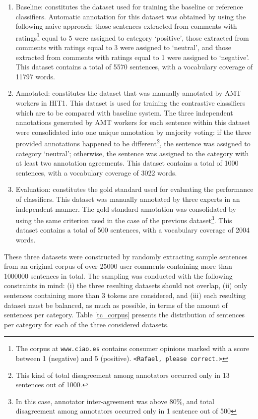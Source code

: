 \documentclass[11pt,letterpaper]{article}
\begin{document}
\begin{enumerate}
\item Baseline: constitutes the dataset used for training the baseline or reference classifiers. 
Automatic annotation for this dataset was obtained by using the following naive approach: those sentences extracted from
comments with ratings\footnote{The corpus at \texttt{www.ciao.es} contains consumer opinions marked with a score between 1 (negative) and 5 (positive). \texttt{<Rafael, please correct.>}} equal to 5 were assigned to category `positive', those extracted from comments with ratings 
equal to 3 were assigned to `neutral', and those extracted from comments with ratings equal to 1 were assigned to
`negative'. This dataset contains a total of 5570 sentences, with a vocabulary coverage of 11797 words. 

\item Annotated: constitutes the dataset that was manually annotated by AMT workers in HIT1.
This dataset is used for training the contrastive classifiers which are to be compared with baseline system.
The three independent annotations generated by AMT workers for each sentence within this dataset were consolidated into one unique annotation
by majority voting: if the three provided annotations happened to be
different\footnote{This kind of total disagreement among annotators occurred only in 13 sentences out of 1000.}, 
the sentence was assigned to category `neutral'; otherwise, the sentence was assigned to the category with
at least two annotation agreements. This dataset contains a total of 1000 sentences, with a vocabulary coverage 
of 3022 words. 

\item Evaluation: constitutes the gold standard used for evaluating the performance of classifiers.
This dataset was manually annotated by three experts in an independent manner. The gold standard annotation
was consolidated by using the same criterion used in the case of the previous dataset\footnote{In this case, 
annotator inter-agreement was above 80\%, and total disagreement among annotators occurred only in 1 sentence
out of 500}. This dataset contains a total of 500 sentences, with a vocabulary coverage of 2004 words.    
\end{enumerate} 

These three datasets were constructed by randomly extracting sample sentences from an original corpus
of over 25000 user comments containing more than 1000000 sentences in total. The sampling was conducted 
with the following constraints in mind: (i) the three resulting datasets should not overlap, (ii) only sentences 
containing more than 3 tokens are considered, and (iii) each resulting dataset must be balanced, as much
as possible, in terms of the amount of sentences per category. Table \ref{tc_corpus} presents the
distribution of sentences per category for each of the three considered datasets.  
\end{document}
